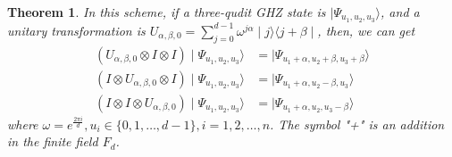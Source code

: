\documentclass[pdflatex,sn-mathphys]{sn-jnl}%
\theoremstyle{thmstyleone}%
\newtheorem{theorem}{Theorem}%
\theoremstyle{thmstyletwo}%
\theoremstyle{thmstylethree}%
\begin{document}
\begin{theorem}
 In this scheme, if a three-qudit GHZ state is $\mid\varPsi_{{u_1},{u_2},{u_3}}\rangle$, and a unitary transformation is $U_{{\alpha},{\beta},{0}}=\sum_{j=0}^{d-1} \omega^{j{\alpha}}\mid{j}\rangle\langle{j+\beta}\mid$, then, we can get
\begin{align}
    (U_{{\alpha},{\beta},{0}}\otimes I \otimes I)\mid\varPsi_{{u_1},{u_2},{u_3}}\rangle &=\mid\varPsi_{{u_1+\alpha},{u_2+\beta},{u_3+\beta}}\rangle \\
    (I \otimes U_{{\alpha},{\beta},{0}} \otimes I)\mid\varPsi_{{u_1},{u_2},{u_3}}\rangle &=\mid\varPsi_{{u_1+\alpha},{u_2-\beta},{u_3}}\rangle \\
    (I \otimes I \otimes U_{{\alpha},{\beta},{0}})\mid\varPsi_{{u_1},{u_2},{u_3}}\rangle &=\mid\varPsi_{{u_1+\alpha},{u_2},{u_3-\beta}}\rangle
\end{align} 
where $\omega=e^\frac{2\pi i}{d},u_i\in\lbrace0,1,\dots,d-1\rbrace, i=1,2,\dots,n$. The symbol "+" is an addition in the finite field $F_d$. 
\end{theorem}
\end{document}

